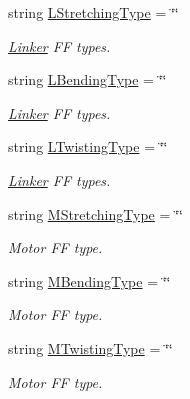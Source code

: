 {\bf }\par
\begin{DoxyCompactItemize}
\item 
string \hyperlink{structMechanicsFFType_a1e03399a615a236fcb90a356d274681c}{L\+Stretching\+Type} = \char`\"{}\char`\"{}
\begin{DoxyCompactList}\small\item\em \hyperlink{classLinker}{Linker} F\+F types. \end{DoxyCompactList}\item 
string \hyperlink{structMechanicsFFType_a14852de6199812e5e6c646f2a8479aac}{L\+Bending\+Type} = \char`\"{}\char`\"{}
\begin{DoxyCompactList}\small\item\em \hyperlink{classLinker}{Linker} F\+F types. \end{DoxyCompactList}\item 
string \hyperlink{structMechanicsFFType_a90c249f75ff2207d3ec927e1e8da57f1}{L\+Twisting\+Type} = \char`\"{}\char`\"{}
\begin{DoxyCompactList}\small\item\em \hyperlink{classLinker}{Linker} F\+F types. \end{DoxyCompactList}\end{DoxyCompactItemize}

{\bf }\par
\begin{DoxyCompactItemize}
\item 
string \hyperlink{structMechanicsFFType_a30fba4413229de2a9ab88af789e47292}{M\+Stretching\+Type} = \char`\"{}\char`\"{}
\begin{DoxyCompactList}\small\item\em Motor F\+F type. \end{DoxyCompactList}\item 
string \hyperlink{structMechanicsFFType_a0bed42c13d0c33d3b37738b44494d8bf}{M\+Bending\+Type} = \char`\"{}\char`\"{}
\begin{DoxyCompactList}\small\item\em Motor F\+F type. \end{DoxyCompactList}\item 
string \hyperlink{structMechanicsFFType_a76f25f6b34dc38d73dfecb236500c53b}{M\+Twisting\+Type} = \char`\"{}\char`\"{}
\begin{DoxyCompactList}\small\item\em Motor F\+F type. \end{DoxyCompactList}\end{DoxyCompactItemize}



